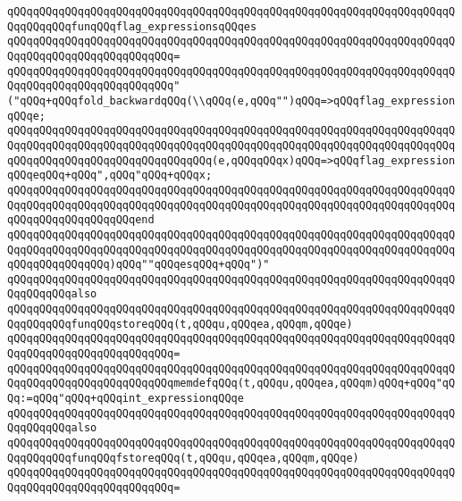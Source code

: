 \verb|qQQqqQQqqQQqqQQqqQQqqQQqqQQqqQQqqQQqqQQqqQQqqQQqqQQqqQQqqQQqqQQqqQQqqQQqqQQqqQQqfunqQQqflag_expressionsqQQqes|\newline
\verb|qQQqqQQqqQQqqQQqqQQqqQQqqQQqqQQqqQQqqQQqqQQqqQQqqQQqqQQqqQQqqQQqqQQqqQQqqQQqqQQqqQQqqQQqqQQqqQQq=|\newline
\verb|qQQqqQQqqQQqqQQqqQQqqQQqqQQqqQQqqQQqqQQqqQQqqQQqqQQqqQQqqQQqqQQqqQQqqQQqqQQqqQQqqQQqqQQqqQQqqQQq"("qQQq+qQQqfold_backwardqQQq(\\qQQq(e,qQQq"")qQQq=>qQQqflag_expressionqQQqe;|\newline
\verb|qQQqqQQqqQQqqQQqqQQqqQQqqQQqqQQqqQQqqQQqqQQqqQQqqQQqqQQqqQQqqQQqqQQqqQQqqQQqqQQqqQQqqQQqqQQqqQQqqQQqqQQqqQQqqQQqqQQqqQQqqQQqqQQqqQQqqQQqqQQqqQQqqQQqqQQqqQQqqQQqqQQqqQQqqQQq(e,qQQqqQQqx)qQQq=>qQQqflag_expressionqQQqeqQQq+qQQq",qQQq"qQQq+qQQqx;|\newline
\verb|qQQqqQQqqQQqqQQqqQQqqQQqqQQqqQQqqQQqqQQqqQQqqQQqqQQqqQQqqQQqqQQqqQQqqQQqqQQqqQQqqQQqqQQqqQQqqQQqqQQqqQQqqQQqqQQqqQQqqQQqqQQqqQQqqQQqqQQqqQQqqQQqqQQqqQQqqQQqqQQqend|\newline
\verb|qQQqqQQqqQQqqQQqqQQqqQQqqQQqqQQqqQQqqQQqqQQqqQQqqQQqqQQqqQQqqQQqqQQqqQQqqQQqqQQqqQQqqQQqqQQqqQQqqQQqqQQqqQQqqQQqqQQqqQQqqQQqqQQqqQQqqQQqqQQqqQQqqQQqqQQqqQQq)qQQq""qQQqesqQQq+qQQq")"|\newline
\newline
\verb|qQQqqQQqqQQqqQQqqQQqqQQqqQQqqQQqqQQqqQQqqQQqqQQqqQQqqQQqqQQqqQQqqQQqqQQqqQQqqQQqalso|\newline
\verb|qQQqqQQqqQQqqQQqqQQqqQQqqQQqqQQqqQQqqQQqqQQqqQQqqQQqqQQqqQQqqQQqqQQqqQQqqQQqqQQqfunqQQqstoreqQQq(t,qQQqu,qQQqea,qQQqm,qQQqe)|\newline
\verb|qQQqqQQqqQQqqQQqqQQqqQQqqQQqqQQqqQQqqQQqqQQqqQQqqQQqqQQqqQQqqQQqqQQqqQQqqQQqqQQqqQQqqQQqqQQqqQQq=|\newline
\verb|qQQqqQQqqQQqqQQqqQQqqQQqqQQqqQQqqQQqqQQqqQQqqQQqqQQqqQQqqQQqqQQqqQQqqQQqqQQqqQQqqQQqqQQqqQQqqQQqmemdefqQQq(t,qQQqu,qQQqea,qQQqm)qQQq+qQQq"qQQq:=qQQq"qQQq+qQQqint_expressionqQQqe|\newline
\newline
\verb|qQQqqQQqqQQqqQQqqQQqqQQqqQQqqQQqqQQqqQQqqQQqqQQqqQQqqQQqqQQqqQQqqQQqqQQqqQQqqQQqalso|\newline
\verb|qQQqqQQqqQQqqQQqqQQqqQQqqQQqqQQqqQQqqQQqqQQqqQQqqQQqqQQqqQQqqQQqqQQqqQQqqQQqqQQqfunqQQqfstoreqQQq(t,qQQqu,qQQqea,qQQqm,qQQqe)|\newline
\verb|qQQqqQQqqQQqqQQqqQQqqQQqqQQqqQQqqQQqqQQqqQQqqQQqqQQqqQQqqQQqqQQqqQQqqQQqqQQqqQQqqQQqqQQqqQQqqQQq=|\newline

